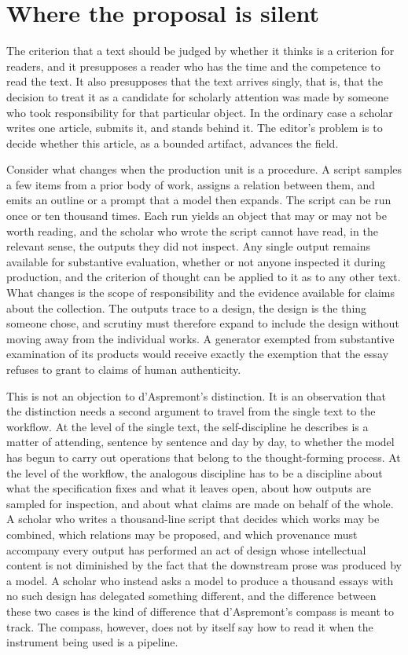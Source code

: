 \documentclass[12pt]{article}
\begin{document}
\section{Where the proposal is silent}

The criterion that a text should be judged by whether it thinks is a criterion for readers, and it presupposes a reader who has the time and the competence to read the text. It also presupposes that the text arrives singly, that is, that the decision to treat it as a candidate for scholarly attention was made by someone who took responsibility for that particular object. In the ordinary case a scholar writes one article, submits it, and stands behind it. The editor's problem is to decide whether this article, as a bounded artifact, advances the field.

Consider what changes when the production unit is a procedure. A script samples a few items from a prior body of work, assigns a relation between them, and emits an outline or a prompt that a model then expands. The script can be run once or ten thousand times. Each run yields an object that may or may not be worth reading, and the scholar who wrote the script cannot have read, in the relevant sense, the outputs they did not inspect. Any single output remains available for substantive evaluation, whether or not anyone inspected it during production, and the criterion of thought can be applied to it as to any other text. What changes is the scope of responsibility and the evidence available for claims about the collection. The outputs trace to a design, the design is the thing someone chose, and scrutiny must therefore expand to include the design without moving away from the individual works. A generator exempted from substantive examination of its products would receive exactly the exemption that the essay refuses to grant to claims of human authenticity.

This is not an objection to d'Aspremont's distinction. It is an observation that the distinction needs a second argument to travel from the single text to the workflow. At the level of the single text, the self-discipline he describes is a matter of attending, sentence by sentence and day by day, to whether the model has begun to carry out operations that belong to the thought-forming process. At the level of the workflow, the analogous discipline has to be a discipline about what the specification fixes and what it leaves open, about how outputs are sampled for inspection, and about what claims are made on behalf of the whole. A scholar who writes a thousand-line script that decides which works may be combined, which relations may be proposed, and which provenance must accompany every output has performed an act of design whose intellectual content is not diminished by the fact that the downstream prose was produced by a model. A scholar who instead asks a model to produce a thousand essays with no such design has delegated something different, and the difference between these two cases is the kind of difference that d'Aspremont's compass is meant to track. The compass, however, does not by itself say how to read it when the instrument being used is a pipeline.
\end{document}
